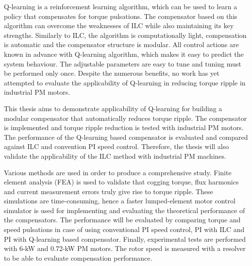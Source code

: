 Q-learning is a reinforcement learning algorithm, which can be used to learn a policy that compensates for torque pulsations. The compensator based on this algorithm can overcome the weaknesses of ILC while also maintaining its key strengths. Similarly to ILC, the algorithm is computationally light, compensation is automatic and the compensator structure is modular. All control actions are known in advance with Q-learning algorithm, which makes it easy to predict the system behaviour. The adjustable parameters are easy to tune and tuning must be performed only once. Despite the numerous benefits, no work has yet attempted to evaluate the applicability of Q-learning in reducing torque ripple in industrial PM motors.






This thesis aims to demonstrate applicability of Q-learning for building a modular compensator that automatically reduces torque ripple. The compensator is implemented and torque ripple reduction is tested with industrial PM motors. The performance of the Q-learning based compensator is evaluated and compared against ILC and convention PI speed control. Therefore, the thesis will also validate the applicability of the ILC method with industrial PM machines.

Various methods are used in order to produce a comprehensive study. Finite element analysis (FEA) is used to validate that cogging torque, flux harmonics and current measurement errors truly give rise to torque ripple. These simulations are time-consuming, hence a faster lumped-element motor control simulator is used for implementing and evaluating the theoretical performance of the compensators. The performance will be evaluated by comparing torque and speed pulsations in case of using conventional PI speed control, PI with ILC and PI with Q-learning based compensator. Finally, experimental tests are performed with 6-kW and 0.72-kW PM motors. The rotor speed is measured with a resolver to be able to evaluate compensation performance.


